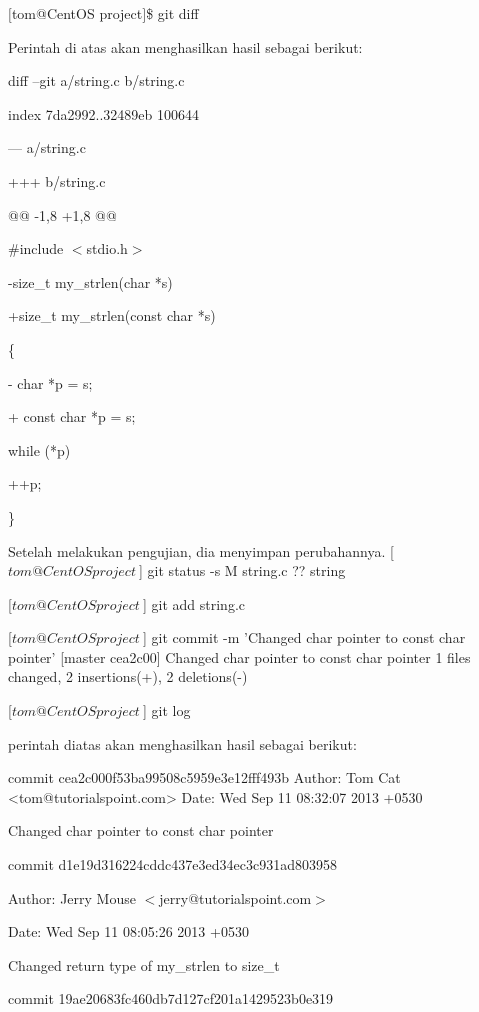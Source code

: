 \documentclass[12pt,a4paper]{article}
\begin{document}
$[$tom@CentOS project$]$\$ git diff\vspace{12pt}

Perintah di atas akan menghasilkan hasil sebagai berikut:\vspace{12pt}

diff --git a/string.c b/string.c

index 7da2992..32489eb 100644

--- a/string.c

+++ b/string.c

@@ -1,8 +1,8 @@

\#include $<$stdio.h$>$

-size\_t my\_strlen(char *s)

+size\_t my\_strlen(const char *s)

\{

 - char *p = s;

 + const char *p = s;

 while (*p)

 ++p;

\}\vspace{12pt}

Setelah melakukan pengujian, dia menyimpan perubahannya.\vspace{12pt}
[$tom@CentOS project ~$] git status -s
M string.c
?? string

[$tom@CentOS project ~$] git add string.c

[$tom@CentOS project ~$] git commit -m 'Changed char pointer to const char pointer'
[master cea2c00] Changed char pointer to const char pointer
1 files changed, 2 insertions(+), 2 deletions(-)

[$tom@CentOS project ~$] git log\vspace{12pt}

perintah diatas akan menghasilkan hasil sebagai berikut:\vspace{12pt}

commit cea2c000f53ba99508c5959e3e12fff493b
Author: Tom Cat <tom@tutorialspoint.com>
Date: Wed Sep 11 08:32:07 2013 +0530

Changed char pointer to const char pointer


commit d1e19d316224cddc437e3ed34ec3c931ad803958

Author: Jerry Mouse $<$jerry@tutorialspoint.com$>$

Date: Wed Sep 11 08:05:26 2013 +0530

Changed return type of my\_strlen to size\_t

commit 19ae20683fc460db7d127cf201a1429523b0e319
\end{document}
